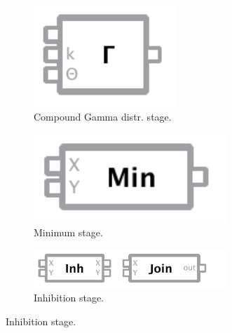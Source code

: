 \begin{figure}[!ht]
 \begin{subfigure}[c]{0.2\textwidth}
   \centering
 	\includegraphics[width=0.6\textwidth]{fig/guigammacp.pdf}
 	\caption{Compound Gamma distr. stage.} \label{fig:itemgammacp}
 \end{subfigure}\hfill
 \begin{subfigure}[c]{0.2\textwidth}
   \centering
 	\includegraphics[width=0.8\textwidth]{fig/guimin.pdf}
 	\caption{Minimum stage.} \label{fig:itemmin}
 \end{subfigure}\hfill
 \begin{subfigure}[c]{0.45\textwidth}
   \centering
 	\includegraphics[width=0.8\textwidth]{fig/guiinh.pdf}
 	\caption{Inhibition stage.} \label{fig:iteminh}
 \end{subfigure}
 

\end{figure}
